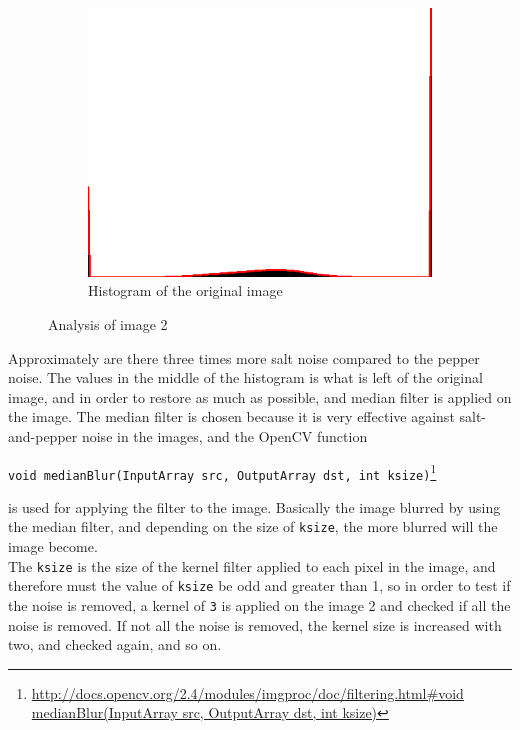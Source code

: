\begin{figure}[H]
\begin{subfigure}[b]{0.446\textwidth}
        \includegraphics[width=\textwidth]{img2/hist.png}
        \caption{Histogram of the original image}
        \label{fig:img2_hist}
    \end{subfigure}
    \caption{Analysis of image 2}\label{fig:img2}
\end{figure}

Approximately are there three times more salt noise compared to the pepper noise. The values in the middle of the histogram is what is left of the original image, and in order to restore as much as possible, and median filter is applied on the image. The median filter is chosen because it is very effective against salt-and-pepper noise in the images, and the OpenCV function
\begin{center}
\lstinline|void medianBlur(InputArray src, OutputArray dst, int ksize)|\footnote{\url{http://docs.opencv.org/2.4/modules/imgproc/doc/filtering.html\#void medianBlur(InputArray src, OutputArray dst, int ksize)}}
\end{center}
is used for applying the filter to the image. Basically the image blurred by using the median filter, and depending on the size of \lstinline|ksize|, the more blurred will the image become.\\[0.2cm]
The \lstinline|ksize| is the size of the kernel filter applied to each pixel in the image, and therefore must the value of \lstinline|ksize| be odd and greater than 1, so in order to test if the noise is removed, a kernel of \lstinline|3| is applied on the image 2 and checked if all the noise is removed. If not all the noise is removed, the kernel size is increased with two, and checked again, and so on.  

